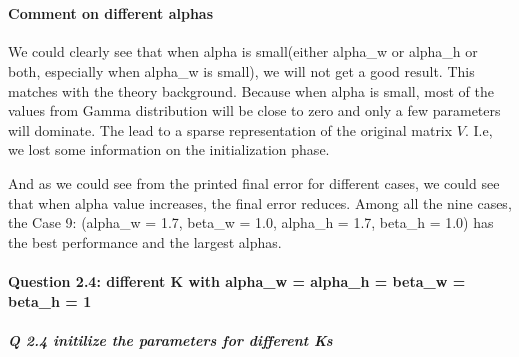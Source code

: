 \documentclass[11pt]{article}
\begin{document}
    \begin{center}
    \end{center}
    { \hspace*{\fill} \\}
    
    \paragraph{Comment on different
alphas}\label{comment-on-different-alphas}

    We could clearly see that when alpha is small(either alpha\_w or
alpha\_h or both, especially when alpha\_w is small), we will not get a
good result. This matches with the theory background. Because when alpha
is small, most of the values from Gamma distribution will be close to
zero and only a few parameters will dominate. The lead to a sparse
representation of the original matrix \(V\). I.e, we lost some
information on the initialization phase.

And as we could see from the printed final error for different cases, we
could see that when alpha value increases, the final error reduces.
Among all the nine cases, the Case 9: (alpha\_w = 1.7, beta\_w = 1.0,
alpha\_h = 1.7, beta\_h = 1.0) has the best performance and the largest
alphas.

    \paragraph{Question 2.4: different K with alpha\_w = alpha\_h = beta\_w
= beta\_h =
1}\label{question-2.4-different-k-with-alpha_w-alpha_h-beta_w-beta_h-1}

    \subparagraph{Q 2.4 initilize the parameters for different
Ks}\label{q-2.4-initilize-the-parameters-for-different-ks}
\end{document}
